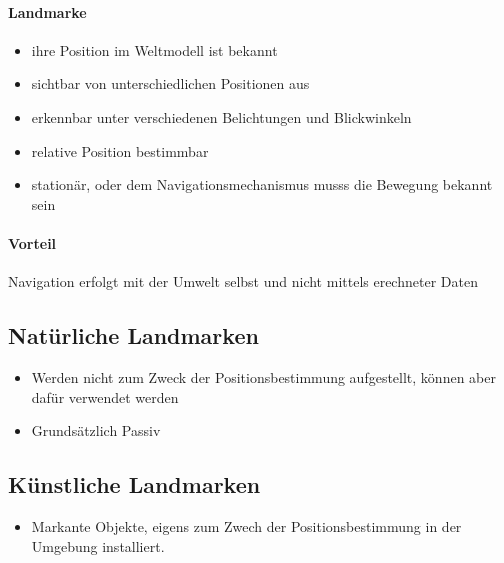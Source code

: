 \paragraph{Landmarke}
\begin{itemize}
	\item ihre Position im Weltmodell ist bekannt
	\item sichtbar von unterschiedlichen Positionen aus
	\item erkennbar unter verschiedenen Belichtungen und Blickwinkeln
	\item relative Position bestimmbar
	\item stationär, oder dem Navigationsmechanismus musss die Bewegung bekannt sein
\end{itemize}
\paragraph{Vorteil} Navigation erfolgt mit der Umwelt selbst und nicht mittels erechneter Daten
\subsection{Natürliche Landmarken}
\begin{itemize}
	\item Werden nicht zum Zweck der Positionsbestimmung aufgestellt, können aber dafür verwendet werden
	\item Grundsätzlich Passiv
\end{itemize}   
\subsection{Künstliche Landmarken}
\begin{itemize}
	\item Markante Objekte, eigens zum Zwech der Positionsbestimmung in der Umgebung installiert.
\end{itemize}




































